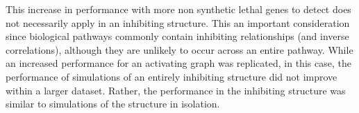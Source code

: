 
This increase in performance with more non synthetic lethal genes to detect does not necessarily apply in an inhibiting  structure. This an important consideration since biological pathways commonly contain inhibiting relationships (and inverse correlations), although they are unlikely to occur across an entire pathway. While an increased performance for an activating graph was replicated, in this case, the performance of simulations of an entirely inhibiting  structure did not improve within a larger dataset. Rather, the performance in the inhibiting  structure was similar to simulations of the  structure in isolation. 
\iffalse
